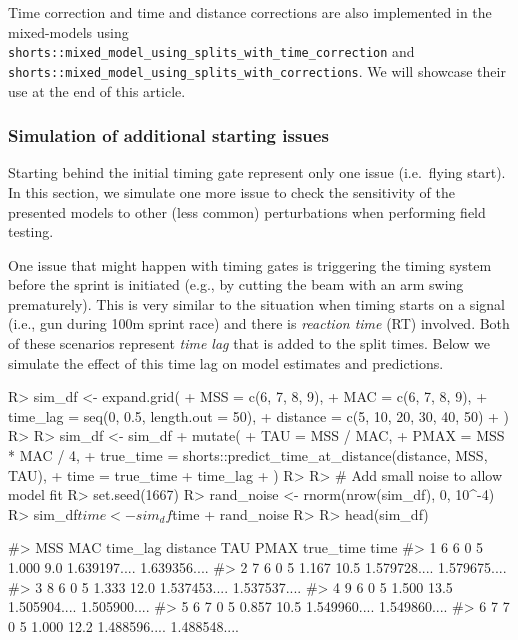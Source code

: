 \documentclass[
]{jss}
\begin{document}
Time correction and time and distance corrections are also implemented in the mixed-models using \texttt{shorts::mixed\_model\_using\_splits\_with\_time\_correction} and \texttt{shorts::mixed\_model\_using\_splits\_with\_corrections}. We will showcase their use at the end of this article.

\hypertarget{simulation-of-additional-starting-issues}{%
\subsubsection{Simulation of additional starting issues}\label{simulation-of-additional-starting-issues}}

Starting behind the initial timing gate represent only one issue (i.e.~flying start). In this section, we simulate one more issue to check the sensitivity of the presented models to other (less common) perturbations when performing field testing.

One issue that might happen with timing gates is triggering the timing system before the sprint is initiated (e.g., by cutting the beam with an arm swing prematurely). This is very similar to the situation when timing starts on a signal (i.e., gun during 100m sprint race) and there is \emph{reaction time} (RT) involved. Both of these scenarios represent \emph{time lag} that is added to the split times. Below we simulate the effect of this time lag on model estimates and predictions.

\begin{CodeChunk}
\begin{CodeInput}
R> sim_df <- expand.grid(
+   MSS = c(6, 7, 8, 9),
+   MAC = c(6, 7, 8, 9),
+   time_lag = seq(0, 0.5, length.out = 50),
+   distance = c(5, 10, 20, 30, 40, 50)
+ )
R> 
R> sim_df <- sim_df %
+   mutate(
+     TAU = MSS / MAC,
+     PMAX = MSS * MAC / 4,
+     true_time = shorts::predict_time_at_distance(distance, MSS, TAU),
+     time = true_time + time_lag
+   )
R> 
R> # Add small noise to allow model fit
R> set.seed(1667)
R> rand_noise <- rnorm(nrow(sim_df), 0, 10^-4)
R> sim_df$time <- sim_df$time + rand_noise
R> 
R> head(sim_df)
\end{CodeInput}
\begin{CodeOutput}
#>   MSS MAC time_lag distance   TAU PMAX    true_time         time
#> 1   6   6        0        5 1.000  9.0 1.639197.... 1.639356....
#> 2   7   6        0        5 1.167 10.5 1.579728.... 1.579675....
#> 3   8   6        0        5 1.333 12.0 1.537453.... 1.537537....
#> 4   9   6        0        5 1.500 13.5 1.505904.... 1.505900....
#> 5   6   7        0        5 0.857 10.5 1.549960.... 1.549860....
#> 6   7   7        0        5 1.000 12.2 1.488596.... 1.488548....
\end{CodeOutput}
\end{CodeChunk}
\end{document}
